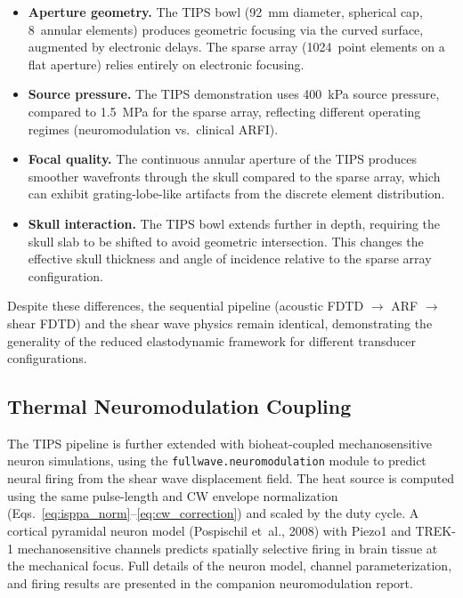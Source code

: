 \documentclass[11pt]{article}
\begin{document}
\begin{itemize}[leftmargin=1.5em]
\item \textbf{Aperture geometry.}  The TIPS bowl (92~mm diameter,
  spherical cap, 8~annular elements) produces geometric focusing via the
  curved surface, augmented by electronic delays.  The sparse array
  (1024~point elements on a flat aperture) relies entirely on electronic
  focusing.

\item \textbf{Source pressure.}  The TIPS demonstration uses 400~kPa source
  pressure, compared to 1.5~MPa for the sparse array, reflecting different
  operating regimes (neuromodulation vs.\ clinical ARFI).

\item \textbf{Focal quality.}  The continuous annular aperture of the TIPS
  produces smoother wavefronts through the skull compared to the sparse
  array, which can exhibit grating-lobe-like artifacts from the discrete
  element distribution.

\item \textbf{Skull interaction.}  The TIPS bowl extends further in depth,
  requiring the skull slab to be shifted to avoid geometric intersection.
  This changes the effective skull thickness and angle of incidence relative
  to the sparse array configuration.
\end{itemize}

Despite these differences, the sequential pipeline (acoustic FDTD $\to$
ARF $\to$ shear FDTD) and the shear wave physics remain identical,
demonstrating the generality of the reduced elastodynamic framework for
different transducer configurations.

\subsection{Thermal Neuromodulation Coupling}

The TIPS pipeline is further extended with bioheat-coupled mechanosensitive
neuron simulations, using the \texttt{fullwave.neuromodulation} module to
predict neural firing from the shear wave displacement field.  The heat
source is computed using the same pulse-length and CW envelope normalization
(Eqs.~\ref{eq:isppa_norm}--\ref{eq:cw_correction}) and scaled by the
duty cycle.  A cortical pyramidal neuron model (Pospischil et~al., 2008)
with Piezo1 and TREK-1 mechanosensitive channels predicts spatially
selective firing in brain tissue at the mechanical focus.  Full details of
the neuron model, channel parameterization, and firing results are
presented in the companion neuromodulation report.
\end{document}
